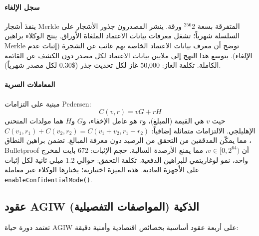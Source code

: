 \documentclass[11pt]{article}
\begin{document}
\paragraph{سجل الإلغاء} ينفذ أشجار Merkle المتفرقة بسعة 2$^{256}$ ورقة. ينشر المصدرون جذور الأشجار على السلسلة شهرياً؛ تشغل معرفات بيانات الاعتماد الملغاة الأوراق. ينتج الوكلاء براهين Merkle توضح أن معرف بيانات الاعتماد الخاصة بهم غائب عن الشجرة (إثبات عدم الإلغاء). يتوسع هذا النهج إلى ملايين بيانات الاعتماد لكل مصدر دون الكشف عن القائمة الكاملة. تكلفة الغاز: 50,000 غاز لكل تحديث جذر (\$0.30 لكل مصدر شهرياً).

\paragraph{المعاملات السرية} مبنية على التزامات Pedersen:
\begin{equation}
C(v, r) = vG + rH
\end{equation}
حيث $v$ هي القيمة (المبلغ)، و$r$ هو عامل الإخفاء، و$G$ و$H$ هما مولدات المنحنى الإهليلجي. الالتزامات متماثلة إضافياً: $C(v_1, r_1) + C(v_2, r_2) = C(v_1 + v_2, r_1 + r_2)$، مما يمكّن المدققين من التحقق من الرصيد دون معرفة المبالغ. تضمن براهين النطاق Bulletproof أن $v \in [0, 2^{64})$، مما يمنع الأرصدة السالبة. حجم الإثبات: 672 بايت لمخرج واحد، نمو لوغاريتمي للبراهين الدفعية. تكلفة التحقق: حوالي 1.2 ميلي ثانية لكل إثبات على الأجهزة العادية. هذه الميزة اختيارية؛ يختارها الوكلاء عبر معاملة \texttt{enableConfidentialMode()}.

\subsection{عقود AGIW الذكية (المواصفات التفصيلية)}
\label{sec:agiw-contracts}
تعتمد دورة حياة AGIW على أربعة عقود أساسية بخصائص اقتصادية وأمنية دقيقة:
\end{document}

